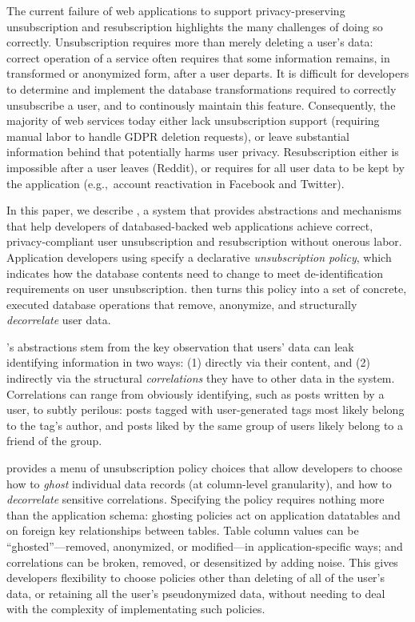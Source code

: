 The current failure of web applications to support privacy-preserving unsubscription and
resubscription  highlights the many challenges of doing so correctly.
%
Unsubscription requires more than merely deleting a user's data: correct operation of a service
often requires that some information remains, in transformed or anonymized form, after a user
departs.
%
%
It is difficult for developers to determine and implement the database transformations required to
correctly unsubscribe a user, and to continously maintain this feature.
%
Consequently, the majority of web services today either lack unsubscription support (requiring
manual labor to handle \eg GDPR deletion requests), or leave substantial information behind that
potentially harms user privacy.
%
Resubscription either is impossible after a user leaves (\eg Reddit), or requires for all user data
to be kept by the application (e.g.,\ account reactivation in Facebook and Twitter).

In this paper, we describe \sys, a system that provides abstractions and mechanisms
that help developers of databased-backed web applications achieve correct,
privacy-compliant user unsubscription and resubscription without onerous labor.
%
Application developers using \sys specify a declarative \emph{unsubscription policy},
which indicates how the database contents need to change to meet de-identification
requirements on user unsubscription.
%
\sys then turns this policy into a set of concrete, executed database operations that remove,
anonymize, and structurally \emph{decorrelate} user data.

\sys's abstractions stem from the key observation that users' data can leak identifying information
in two ways: (1) directly via their content, and (2) indirectly via the structural
\emph{correlations} they have to other data in the system.  Correlations can range from obviously
identifying, such as posts written by a user, to subtly perilous: posts tagged with user-generated
tags most likely belong to the tag's author, and posts liked by the same group of users likely
belong to a friend of the group.

%
\sys provides a menu of unsubscription policy choices that allow developers to choose how to
\emph{ghost} individual data records (at column-level granularity), and how to \emph{decorrelate}
sensitive correlations. Specifying the policy requires nothing more than the application schema:
ghosting policies act on application datatables and on foreign key relationships between tables.
Table column values can be ``ghosted''---removed, anonymized, or modified---in application-specific
ways; and correlations can be broken, removed, or desensitized by adding noise. This gives
developers flexibility to choose policies other than deleting of all of the user's data, or
retaining all the user's pseudonymized data, without needing to deal with the complexity of
implementating such policies.

